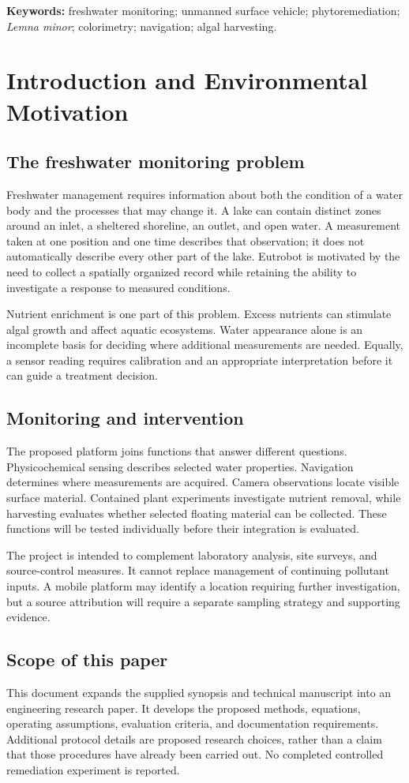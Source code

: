 \documentclass[12pt,a4paper]{article}
\newcommand{\papersection}[1]{\clearpage\section{#1}}
\begin{document}
\textbf{Keywords:} freshwater monitoring; unmanned surface vehicle; phytoremediation; \textit{Lemna minor}; colorimetry; navigation; algal harvesting.

\papersection{Introduction and Environmental Motivation}
\subsection{The freshwater monitoring problem}
Freshwater management requires information about both the condition of a water body and the processes that may change it. A lake can contain distinct zones around an inlet, a sheltered shoreline, an outlet, and open water. A measurement taken at one position and one time describes that observation; it does not automatically describe every other part of the lake. Eutrobot is motivated by the need to collect a spatially organized record while retaining the ability to investigate a response to measured conditions.

Nutrient enrichment is one part of this problem. Excess nutrients can stimulate algal growth and affect aquatic ecosystems. Water appearance alone is an incomplete basis for deciding where additional measurements are needed. Equally, a sensor reading requires calibration and an appropriate interpretation before it can guide a treatment decision.

\subsection{Monitoring and intervention}
The proposed platform joins functions that answer different questions. Physicochemical sensing describes selected water properties. Navigation determines where measurements are acquired. Camera observations locate visible surface material. Contained plant experiments investigate nutrient removal, while harvesting evaluates whether selected floating material can be collected. These functions will be tested individually before their integration is evaluated.

The project is intended to complement laboratory analysis, site surveys, and source-control measures. It cannot replace management of continuing pollutant inputs. A mobile platform may identify a location requiring further investigation, but a source attribution will require a separate sampling strategy and supporting evidence.

\subsection{Scope of this paper}
This document expands the supplied synopsis and technical manuscript into an engineering research paper. It develops the proposed methods, equations, operating assumptions, evaluation criteria, and documentation requirements. Additional protocol details are proposed research choices, rather than a claim that those procedures have already been carried out. No completed controlled remediation experiment is reported.
\end{document}
